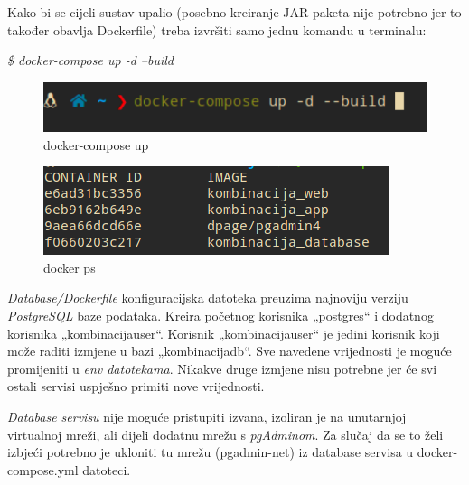 		Kako bi se cijeli sustav upalio (posebno kreiranje JAR paketa nije potrebno jer to također obavlja Dockerfile) treba izvršiti samo jednu komandu u terminalu:
		
		 \textit{\$ docker-compose up -d --build}
		
		\begin{figure}[H]
					\includegraphics[scale=0.5]{figures/terminl_1.PNG}
					\centering
					\caption{docker-compose up}
					\label{fig:sekv-uc13}
				\end{figure}
				
		\begin{figure}[H]
					\includegraphics[scale=1]{figures/2-ps.PNG}
					\centering
					\caption{docker ps}
					\label{fig:sekv-uc13}
				\end{figure}
						
				
				
				
				
		 \textit{Database/Dockerfile} konfiguracijska datoteka preuzima najnoviju verziju  \textit{PostgreSQL} baze podataka. Kreira početnog korisnika „postgres“ i dodatnog korisnika „kombinacijauser“. Korisnik „kombinacijauser“ je jedini korisnik koji može raditi izmjene u bazi „kombinacijadb“. Sve navedene vrijednosti je moguće promijeniti u  \textit{env datotekama}. Nikakve druge izmjene nisu potrebne jer će svi ostali servisi uspješno primiti nove vrijednosti.

		 \textit{Database servisu} nije moguće pristupiti izvana, izoliran je na unutarnjoj virtualnoj mreži, ali dijeli dodatnu mrežu s  \textit{pgAdminom}. Za slučaj da se to želi izbjeći potrebno je ukloniti tu mrežu (pgadmin-net) iz database servisa u docker-compose.yml datoteci.	
			
			
						
